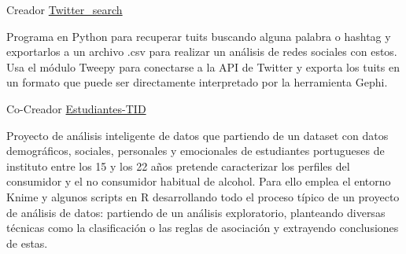


\begin{cventries}


\cventry
{Creador} %
{\href{https://github.com/AythaE/twitter_search}{Twitter\_search}} %
{} %
{} %
{ %
\begin{cvitems}
\item {Programa en Python para recuperar tuits buscando alguna palabra o hashtag y exportarlos a un archivo .csv para realizar un análisis de redes sociales con estos. Usa el módulo Tweepy para conectarse a la API de Twitter y exporta los tuits en un formato que puede ser directamente interpretado por la herramienta Gephi.}
\end{cvitems}
}



\cventry
{Co-Creador} %
{\href{https://github.com/AythaE/Estudiantes-TID}{Estudiantes-TID}} %
{} %
{} %
{ %
	\begin{cvitems}
		\item {Proyecto de análisis inteligente de datos que partiendo de un dataset con datos demográficos, sociales, personales y emocionales de estudiantes portugueses de instituto entre los 15 y los 22 años pretende caracterizar los perfiles del consumidor y el no consumidor habitual de alcohol. Para ello emplea el entorno Knime y algunos scripts en R desarrollando todo el proceso típico de un proyecto de análisis de datos: partiendo de un análisis exploratorio, planteando diversas técnicas como la clasificación o las reglas de asociación y extrayendo conclusiones de estas.}
	\end{cvitems}
}



\end{cventries}
